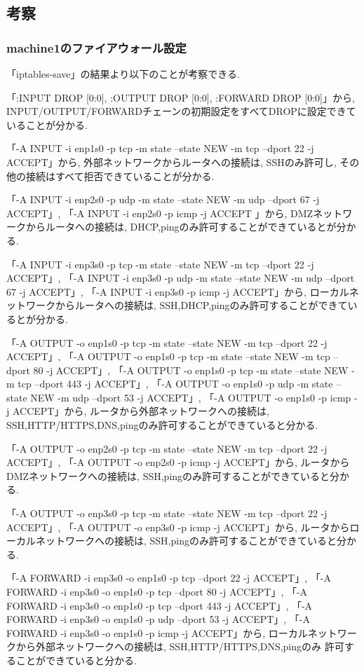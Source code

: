 \documentclass{ltjsarticle} %
\begin{document}
\subsection{考察}

\subsubsection{machine1のファイアウォール設定}
「iptables-save」の結果より以下のことが考察できる. 

「:INPUT DROP [0:0], :OUTPUT DROP [0:0], :FORWARD DROP [0:0]」から, 
INPUT/OUTPUT/FORWARDチェーンの初期設定をすべてDROPに設定できていることが分かる. 

「-A INPUT -i enp1s0 -p tcp -m state --state NEW -m tcp --dport 22 -j ACCEPT」から, 
外部ネットワークからルータへの接続は, SSHのみ許可し, その他の接続はすべて拒否できていることが分かる. 

「-A INPUT -i enp2s0 -p udp -m state --state NEW -m udp --dport 67 -j ACCEPT」, 
「-A INPUT -i enp2s0 -p icmp -j ACCEPT 」から, 
DMZネットワークからルータへの接続は, DHCP,pingのみ許可することができているとが分かる. 

「-A INPUT -i enp3s0 -p tcp -m state --state NEW -m tcp --dport 22 -j ACCEPT」,
「-A INPUT -i enp3s0 -p udp -m state --state NEW -m udp --dport 67 -j ACCEPT」,
「-A INPUT -i enp3s0 -p icmp -j ACCEPT」から, 
ローカルネットワークからルータへの接続は, SSH,DHCP,pingのみ許可することができているとが分かる. 

「-A OUTPUT -o enp1s0 -p tcp -m state --state NEW -m tcp --dport 22 -j ACCEPT」,
「-A OUTPUT -o enp1s0 -p tcp -m state --state NEW -m tcp --dport 80 -j ACCEPT」,
「-A OUTPUT -o enp1s0 -p tcp -m state --state NEW -m tcp --dport 443 -j ACCEPT」,
「-A OUTPUT -o enp1s0 -p udp -m state --state NEW -m udp --dport 53 -j ACCEPT」,
「-A OUTPUT -o enp1s0 -p icmp -j ACCEPT」から, 
ルータから外部ネットワークへの接続は, SSH,HTTP/HTTPS,DNS,pingのみ許可することができていると分かる. 

「-A OUTPUT -o enp2s0 -p tcp -m state --state NEW -m tcp --dport 22 -j ACCEPT」,
「-A OUTPUT -o enp2s0 -p icmp -j ACCEPT」から, 
ルータからDMZネットワークへの接続は, SSH,pingのみ許可することができていると分かる. 

「-A OUTPUT -o enp3s0 -p tcp -m state --state NEW -m tcp --dport 22 -j ACCEPT」,
「-A OUTPUT -o enp3s0 -p icmp -j ACCEPT」から, 
ルータからローカルネットワークへの接続は, SSH,pingのみ許可することができていると分かる. 

「-A FORWARD -i enp3s0 -o enp1s0 -p tcp --dport 22 -j ACCEPT」,
「-A FORWARD -i enp3s0 -o enp1s0 -p tcp --dport 80 -j ACCEPT」,
「-A FORWARD -i enp3s0 -o enp1s0 -p tcp --dport 443 -j ACCEPT」,
「-A FORWARD -i enp3s0 -o enp1s0 -p udp --dport 53 -j ACCEPT」,
「-A FORWARD -i enp3s0 -o enp1s0 -p icmp -j ACCEPT」から,
ローカルネットワークから外部ネットワークへの接続は, SSH,HTTP/HTTPS,DNS,pingのみ
許可することができていると分かる. 
\end{document}
